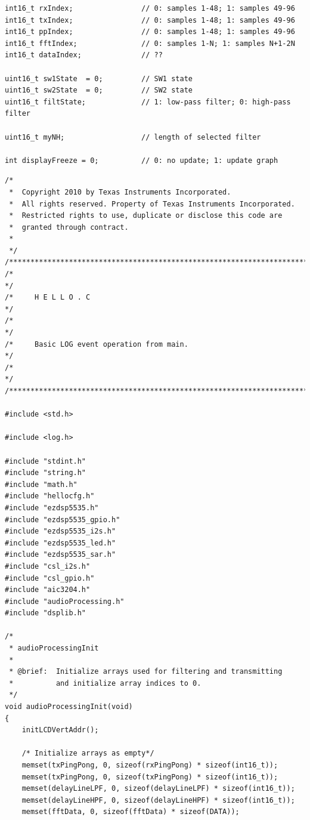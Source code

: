 \documentclass[11pt,pdftex,portrait,letterpaper]{article}
\begin{document}
\begin{lstlisting}[caption={audioProcessing.h}, label=l:program2]
int16_t rxIndex;				// 0: samples 1-48; 1: samples 49-96
int16_t txIndex;				// 0: samples 1-48; 1: samples 49-96
int16_t ppIndex;				// 0: samples 1-48; 1: samples 49-96
int16_t fftIndex;				// 0: samples 1-N; 1: samples N+1-2N
int16_t dataIndex;				// ??

uint16_t sw1State  = 0;       	// SW1 state
uint16_t sw2State  = 0;       	// SW2 state
uint16_t filtState;				// 1: low-pass filter; 0: high-pass filter

uint16_t myNH;					// length of selected filter

int displayFreeze = 0;			// 0: no update; 1: update graph
\end{lstlisting}
\pagebreak

\begin{lstlisting}[caption={audioProcessing.c}, label=l:program3]
/*
 *  Copyright 2010 by Texas Instruments Incorporated.
 *  All rights reserved. Property of Texas Instruments Incorporated.
 *  Restricted rights to use, duplicate or disclose this code are
 *  granted through contract.
 *
 */
/***************************************************************************/
/*                                                                         */
/*     H E L L O . C                                                       */
/*                                                                         */
/*     Basic LOG event operation from main.                                */
/*                                                                         */
/***************************************************************************/

#include <std.h>

#include <log.h>

#include "stdint.h"
#include "string.h"
#include "math.h"
#include "hellocfg.h"
#include "ezdsp5535.h"
#include "ezdsp5535_gpio.h"
#include "ezdsp5535_i2s.h"
#include "ezdsp5535_led.h"
#include "ezdsp5535_sar.h"
#include "csl_i2s.h"
#include "csl_gpio.h"
#include "aic3204.h"
#include "audioProcessing.h"
#include "dsplib.h"

/*
 * audioProcessingInit
 *
 * @brief: 	Initialize arrays used for filtering and transmitting
 * 			and initialize array indices to 0.
 */
void audioProcessingInit(void)
{
	initLCDVertAddr();

	/* Initialize arrays as empty*/
	memset(txPingPong, 0, sizeof(rxPingPong) * sizeof(int16_t));
	memset(txPingPong, 0, sizeof(txPingPong) * sizeof(int16_t));
	memset(delayLineLPF, 0, sizeof(delayLineLPF) * sizeof(int16_t));
	memset(delayLineHPF, 0, sizeof(delayLineHPF) * sizeof(int16_t));
	memset(fftData, 0, sizeof(fftData) * sizeof(DATA));


\end{lstlisting}
\end{document}
